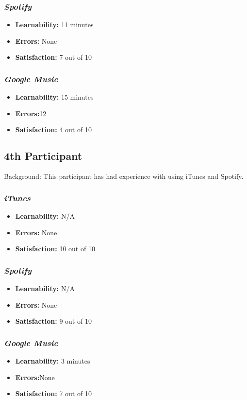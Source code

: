 \documentclass{article}
\begin{document}
{\begin{multicols}{2}
\subsubsection{\it Spotify}
\begin{itemize}
	\item {\bf Learnability:} 11 minutes
	\item {\bf Errors:} None
	\item {\bf Satisfaction:} 7 out of 10 
\end{itemize}

\subsubsection{\it Google Music}
\begin{itemize}
\item {\bf Learnability:} 15 minutes
	\item {\bf Errors:}12
	\item {\bf Satisfaction:} 4 out of 10 
\end{itemize}

\subsection{4th Participant}
Background: This participant has had experience with using iTunes and Spotify.

\subsubsection{\it iTunes}
\begin{itemize}
	\item {\bf Learnability:} N/A
	\item {\bf Errors:} None
	\item {\bf Satisfaction:} 10 out of 10 
\end{itemize}

\subsubsection{\it Spotify}
\begin{itemize}
	\item {\bf Learnability:} N/A
	\item {\bf Errors:} None
	\item {\bf Satisfaction:} 9 out of 10 
\end{itemize}

\subsubsection{\it Google Music}
\begin{itemize}
\item {\bf Learnability:} 3 minutes
	\item {\bf Errors:}None
	\item {\bf Satisfaction:} 7 out of 10 
\end{itemize}


\end{multicols}}
\end{document}
